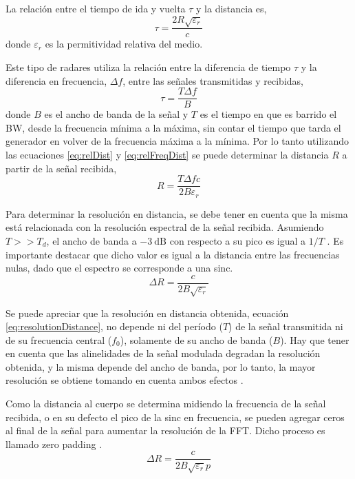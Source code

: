 La relación entre el tiempo de ida y vuelta $\tau$ y la distancia es,
\begin{equation}\label{eq:relDist}
  \tau = \dfrac{2R\sqrt{\varepsilon_r}}{c}
\end{equation}
donde $\varepsilon_r$ es la permitividad relativa del medio.

Este tipo de radares utiliza la relación entre la diferencia de tiempo $\tau$ y la diferencia en frecuencia, $\Delta f$, entre las señales transmitidas y recibidas,
\begin{equation}\label{eq:relFreqDist}
  \tau = \dfrac{T\Delta f}{B}
\end{equation}
donde $B$ es el ancho de banda de la señal y $T$ es el tiempo en que es barrido el BW, desde la frecuencia mínima a la máxima, sin contar el tiempo que tarda el generador en volver de la frecuencia máxima a la mínima. Por lo tanto utilizando las ecuaciones \ref{eq:relDist} y \ref{eq:relFreqDist} se puede determinar la distancia $R$ a partir de la señal recibida,
\begin{equation}\label{eq:receivedDist}
  R = \dfrac{T\Delta fc}{2B\varepsilon_r}
\end{equation}

Para determinar la resolución en distancia, se debe tener en cuenta que la misma está relacionada con la resolución espectral de la señal recibida. Asumiendo $T >> T_d$, el ancho de banda a $\SI{-3}{\dB}$ con respecto a su pico es igual a $1/T$ \cite{Brooker2005}. Es importante destacar que dicho valor es igual a la distancia entre las frecuencias nulas, dado que el espectro se corresponde a una sinc.
\begin{equation}\label{eq:resolutionDistance}
  \Delta R = \dfrac{c}{2B\sqrt{\varepsilon_r}}
\end{equation}

Se puede apreciar que la resolución en distancia obtenida, ecuación \ref{eq:resolutionDistance}, no depende ni del período ($T$) de la señal transmitida ni de su frecuencia central ($f_0$), solamente de su ancho de banda ($B$). Hay que tener en cuenta que las alinelidades de la señal modulada degradan la resolución obtenida, y la misma depende del ancho de banda, por lo tanto, la mayor resolución se obtiene tomando en cuenta ambos efectos \cite{Brooker2005}.

Como la distancia al cuerpo se determina midiendo la frecuencia de la señal recibida, o en su defecto el pico de la sinc en frecuencia, se pueden agregar ceros al final de la señal para aumentar la resolución de la FFT. Dicho proceso es llamado zero padding \cite{Oppenheim1990}.
\begin{equation}\label{eq:resolutionDistance2}
  \Delta R = \dfrac{c}{2B\sqrt{\varepsilon_r}p}
\end{equation}

